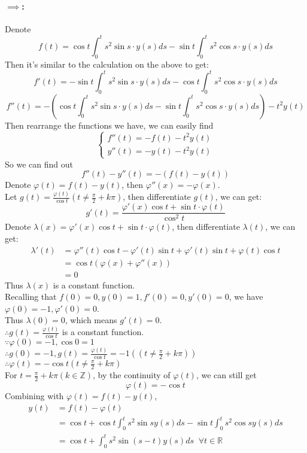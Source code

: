 \documentclass{article}
\begin{document}
\paragraph{$\implies$:}
Denote
$$f(t)=\cos t\int_{0}^{t}s^2\sin s \cdot y(s)ds 
-\sin t\int_{0}^{t}s^2\cos s \cdot y(s)ds$$
Then it's similar to the calculation on the above to get:
$$f'(t)=-\sin t \int_{0}^{t}s^2\sin s\cdot y(s)ds-
\cos t \int_{0}^{t}s^2 \cos s \cdot y(s)ds$$
$$f''(t)=-\left(\cos t\int_{0}^{t}s^2\sin s \cdot y(s)ds-\sin t\int_{0}^{t}s^2\cos s\cdot y(s)ds\right)-
    t^2y(t)$$
Then rearrange the functions we have, we can easily find
$$\left\{
    \begin{aligned}
        f''(t)=-f(t)-t^2y(t)\\
        y''(t)=-y(t)-t^2y(t)
    \end{aligned}
\right.
$$
So we can find out
$$f''(t)-y''(t)=-\left(f(t)-y(t)\right)$$
Denote $\varphi (t)=f(t)-y(t)$, then $\varphi ''(x)=-\varphi (x)$.\\
Let $g(t)=\frac{\varphi (t)}{\cos t} \left(t\neq\frac{\pi}{2}+k\pi\right)$,
then differentiate $g(t)$, we can get:
$$g'(t)=\frac{\varphi '(x)\cos t+\sin t\cdot \varphi (t)}{\cos^2 t}$$
Denote $\lambda (x)=\varphi '(x)\cos t+\sin t \cdot \varphi (t)$, then
differentiate $\lambda(t)$, we can get:
\begin{align*}
    \lambda'(t)&=\varphi ''(t)\cos t-\varphi '(t)\sin t+\varphi '(t)\sin t 
    +\varphi(t)\cos t\\
    &=\cos t(\varphi(x)+\varphi ''(x))\\
    &=0
\end{align*}
Thus $\lambda(x)$ is a constant function.\\
Recalling that $f(0)=0,y(0)=1,f'(0)=0,y'(0)=0$, we have
$\varphi(0)=-1,\varphi'(0)=0$. \\
Thus $\lambda(0)=0$, which means
$g'(t)=0$.\\
$\therefore g(t)=\frac{\varphi (t)}{\cos t}$ is a constant function.\\
$\because \varphi(0)=-1,\cos 0=1$\\
$\therefore g(0)=-1,g(t)=\frac{\varphi (t)}{\cos t}=-1 \left(\left(t\neq\frac{\pi}{2}+k\pi\right)\right)$
$\therefore \varphi (t)=-\cos t \left(t\neq\frac{\pi}{2}+k\pi\right)$\\
For $t=\frac{\pi}{2}+k\pi(k\in\mathbb{Z})$, by the continuity of $\varphi (t)$, we can still get
$$\varphi (t)=-\cos t$$
Combining with $\varphi (t)=f(t)-y(t)$,
\begin{align*}
    y(t)&=f(t)-\varphi(t)\\
    &=\cos t +\cos t\int_{0}^{t}s^2\sin s y(s)ds -\sin t\int_{0}^{t}
    s^2\cos sy(s)ds\\
    &=\cos t+\int_{0}^{t}s^2\sin(s-t)y(s)ds \;\; \forall t\in\mathbb{R}
\end{align*}
\end{document}
